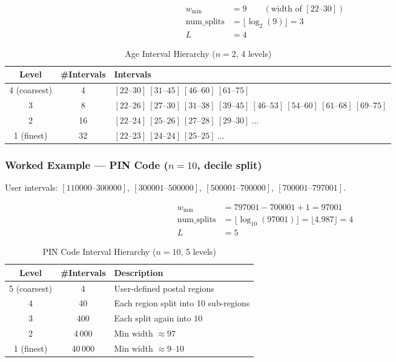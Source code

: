 \documentclass[12pt,a4paper]{article}
\begin{document}
\begin{align*}
  w_{\min} &= 9 \qquad (\text{width of }[22\text{--}30]) \\
  \text{num\_splits} &= \lfloor\log_2(9)\rfloor = 3 \\
  L &= 4
\end{align*}

\begin{table}[H]
\centering
\caption{Age Interval Hierarchy ($n{=}2$, 4 levels)}
\begin{tabular}{ccp{9cm}}
\toprule
Level & \#Intervals & Intervals \\
\midrule
4 (coarsest) & 4 & $[22\text{--}30]\ [31\text{--}45]\ [46\text{--}60]\ [61\text{--}75]$ \\
3 & 8 & $[22\text{--}26]\ [27\text{--}30]\ [31\text{--}38]\ [39\text{--}45]\ [46\text{--}53]\ [54\text{--}60]\ [61\text{--}68]\ [69\text{--}75]$ \\
2 & 16 & $[22\text{--}24]\ [25\text{--}26]\ [27\text{--}28]\ [29\text{--}30]\ \ldots$ \\
1 (finest) & 32 & $[22\text{--}23]\ [24\text{--}24]\ [25\text{--}25]\ \ldots$ \\
\bottomrule
\end{tabular}
\end{table}

\subsubsection{Worked Example — PIN Code ($n=10$, decile split)}

User intervals: $[110000\text{--}300000],\ [300001\text{--}500000],\
[500001\text{--}700000],\ [700001\text{--}797001]$.

\begin{align*}
  w_{\min} &= 797001 - 700001 + 1 = 97001 \\
  \text{num\_splits} &= \lfloor\log_{10}(97001)\rfloor = \lfloor 4.987 \rfloor = 4 \\
  L &= 5
\end{align*}

\begin{table}[H]
\centering
\caption{PIN Code Interval Hierarchy ($n{=}10$, 5 levels)}
\begin{tabular}{ccp{9cm}}
\toprule
Level & \#Intervals & Description \\
\midrule
5 (coarsest) & 4 & User-defined postal regions \\
4 & 40 & Each region split into 10 sub-regions \\
3 & 400 & Each split again into 10 \\
2 & 4\,000 & Min width $\approx 97$ \\
1 (finest) & 40\,000 & Min width $\approx 9$--$10$ \\
\bottomrule
\end{tabular}
\end{table}
\end{document}
